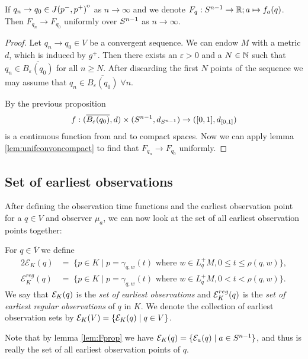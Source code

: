 \begin{proposition}\label{prop:funif}
    If $q_n \to q_0\in {\kern0ptJ(p^-,p^+)}^{\mathrm{o}}$ as $n\to \infty$ and we denote $F_q:{S^{n-1}}\to\mathbb{R};a\mapsto f_a(q)$. Then $F_{q_n}\to F_{q_0}$ uniformly over ${S^{n-1}}$ as $n\to \infty$.
\end{proposition}
\begin{proof}
    Let $q_n \to q_0 \in V$ be a convergent sequence. We can endow $M$ with a metric $d$, which is induced by $g^+$. Then there exists an $\varepsilon>0$ and a $N\in \mathbb{N}$ such that $q_n\in \overline{B_\varepsilon(q_0)}$ for all $n\ge N$. After discarding the first $N$ points of the sequence we may assume that $q_n \in \overline{B_\varepsilon(q_0)} \; \forall n$.

    By the previous proposition 
    \begin{align*}
        f:(\overline{B_\varepsilon(q_0)},d)\times({S^{n-1}}, d_{{S^{n-1}}}) \to ([0,1],d_{[0,1]})
    \end{align*} is a continuous function from and to compact spaces. Now we can apply lemma \ref{lem:unifconvoncompact} to find that $F_{q_n}\to F_{q_0}$ uniformly.
     
\end{proof}

\subsection{Set of earliest observations}
After defining the observation time functions and the earliest observation point for a $q\in V$ and observer $\mu_a$, we can now look at the set of all earliest observation points together:
\begin{definition}
For $q\in \overline{V}$ we define
\begin{alignat*}{2}
    \mathcal{E}_K(q) &=\; \{p\in K \mid p = \gamma_{q,w}(t) \text{ where } w\in L_q^+M, 0\leq t \leq \rho(q,w)\},\\
    \mathcal{E}^{reg}_K(q) &=\; \{p\in K \mid p = \gamma_{q,w}(t) \text{ where } w\in L_q^+M, 0< t < \rho(q,w)\}.
\end{alignat*}
We say that ${\mathcal{E}}_K(q)$ is the \emph{set of earliest observations} and ${\mathcal{E}}^{reg}_K(q)$ is the \emph{set of earliest regular observations} of $q$ in $K$. We denote the collection of earliest observation sets by ${\mathcal{E}}_K(V) = \{ {\mathcal{E}}_K(q) \mid q\in V\}$.
\end{definition}
Note that by lemma \ref{lem:Fprop} we have ${\mathcal{E}}_K(q) = \{ {\mathcal{E}}_a(q) \mid a\in {S^{n-1}} \}$, and thus is really the set of all earliest observation points of $q$.


